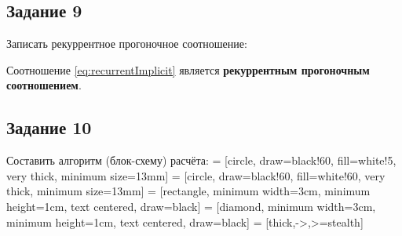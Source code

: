 \documentclass[12pt, a4paper]{report}
\begin{document}
	\subsection*{Задание 9}
	\large
	Записать рекуррентное прогоночное соотношение: \par
	Соотношение \eqref{eq:recurrentImplicit} является \textbf{рекуррентным прогоночным соотношением}.
		
	\subsection*{Задание 10}
	\large
	Составить алгоритм (блок-схему) расчёта:
	 = [circle, draw=black!60, fill=white!5, very thick, minimum size=13mm]
	 = [circle, draw=black!60, fill=white!60, very thick, minimum size=13mm]
	 = [rectangle, minimum width=3cm, minimum height=1cm, text centered, draw=black]
	 = [diamond, minimum width=3cm, minimum height=1cm, text centered, draw=black]
	 = [thick,->,>=stealth]
\end{document}
